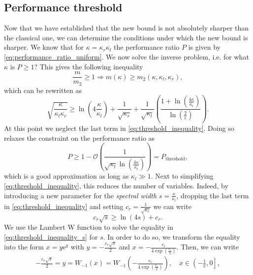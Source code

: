 \subsection{Performance threshold}\label{sec:performance_threshold}
Now that we have established that the new bound is not absolutely sharper than the classical one, we can determine the conditions under which the new bound is sharper. We know that for $\kappa=\kappa_r\kappa_l$ the performance ratio $P$ is given by \cref{eq:performance_ratio_uniform}. We now solve the inverse problem, i.e. for what $\kappa$ is $P \geq 1$? This gives the following inequality
\[
    \frac{m}{m_2} \geq 1 \Rightarrow m(\kappa) \geq m_2(\kappa, \kappa_l, \kappa_r),
\]
which can be rewritten as
\begin{equation}
    \sqrt{\frac{\kappa}{\kappa_l\kappa_r}} \geq \ln\left(4\frac{\kappa}{\kappa_l}\right) + \frac{1}{\sqrt{\kappa_r}} + \frac{1}{\sqrt{\kappa_l}}\left(\frac{1 + \ln\left(\frac{4\kappa}{\kappa_l}\right)}{\ln\left(\frac{2}{\epsilon}\right)}\right).
    \label{eq:threshold_inequality}
\end{equation}
At this point we neglect the last term in \cref{eq:threshold_inequality}. Doing so relaxes the constraint on the performance ratio as
\begin{equation}
    P \geq 1 - \mathcal{O}\left(\frac{1}{\sqrt{\kappa_l}\ln\left(\frac{4\kappa}{\kappa_l}\right)}\right) = P_{\text{threshold}},
    \label{eq:approximate_performance_ratio_threshold}
\end{equation}
which is a good approximation as long as $\kappa_l \gg 1$. Next to simplifying \cref{eq:threshold_inequality}, this reduces the number of variables. Indeed, by introducing a new parameter for the \textit{spectral width} $s = \frac{\kappa}{\kappa_l}$, dropping the last term in \cref{eq:threshold_inequality} and setting $c_r = \frac{1}{\sqrt{\kappa_r}}$ we can write
\begin{equation}
    c_r\sqrt{s} \geq \ln\left(4s\right) + c_r.
    \label{eq:threshold_inequality_s}
\end{equation}
We use the Lambert $\mathrm{W}$ function to solve the equality in \cref{eq:threshold_inequality_s} for $s$. In order to do so, we transform the equality into the form $x = y \mathrm{e}^y$ with $y = -\frac{c_r\sqrt{s}}{2}$ and $x = -\frac{c_r}{4\exp\left(\frac{c_r}{2}\right)}$. Then, we can write
\begin{align*}
    -\frac{c_r\sqrt{s}}{2} = y = W_{-1}(x) = W_{-1}\left(-\frac{c_r}{4\exp\left(\frac{c_r}{2}\right)}\right), \quad x \in \left(-\frac{1}{\mathrm{e}}, 0 \right],
\end{align*}

